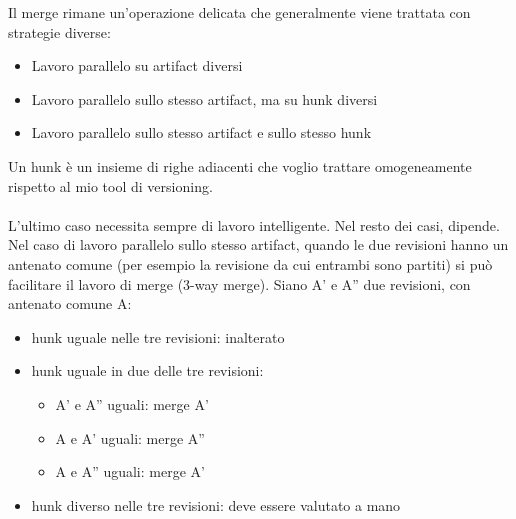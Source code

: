 \noindent Il merge rimane un'operazione delicata che generalmente viene trattata con strategie diverse:
\begin{itemize}
\item Lavoro parallelo su artifact diversi
\item Lavoro parallelo sullo stesso artifact, ma su hunk diversi
\item Lavoro parallelo sullo stesso artifact e sullo stesso hunk
\end{itemize}

\noindent Un hunk è un insieme di righe adiacenti che voglio trattare omogeneamente rispetto al mio tool di versioning.
\\\\
\noindent L'ultimo caso necessita sempre di lavoro intelligente. Nel resto dei casi, dipende. Nel caso di lavoro parallelo sullo stesso artifact, quando le due revisioni hanno un antenato comune (per esempio la revisione da cui entrambi sono partiti) si può facilitare il lavoro di merge (3-way merge). Siano A' e A'' due revisioni, con antenato comune A:

\begin{itemize}
    \item hunk uguale nelle tre revisioni: inalterato
    \item hunk uguale in due delle tre revisioni:
    \begin{itemize}
        \item A' e A'' uguali: merge A'
        \item A e A' uguali: merge A''
        \item A e A'' uguali: merge A'
    \end{itemize}
    \item hunk diverso nelle tre revisioni: deve essere valutato a mano
\end{itemize}